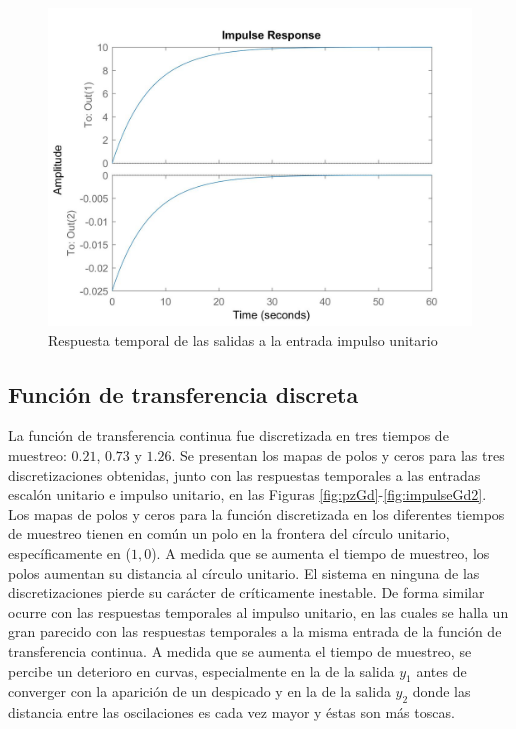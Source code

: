 \documentclass[journal]{IEEEtran}
\begin{document}
\begin{figure}[ht!]
\caption{Respuesta temporal de las salidas a la entrada impulso unitario\label{fig:impulseGr}}
  \centering
\includegraphics[scale=0.18]{tf/impulse_Gr.jpg}
\end{figure}

\subsection{Función de transferencia discreta}
La función de transferencia continua fue discretizada en tres tiempos de muestreo: $0.21$, $0.73$ y $1.26$. Se presentan los mapas de polos y ceros para las tres discretizaciones obtenidas, junto con las respuestas temporales a las entradas escalón unitario e impulso unitario, en las Figuras \ref{fig:pzGd}-\ref{fig:impulseGd2}. Los mapas de polos y ceros para la función discretizada en los diferentes tiempos de muestreo tienen en común un polo en la frontera del círculo unitario, específicamente en ($1,0$). A medida que se aumenta el tiempo de muestreo, los polos aumentan su distancia al círculo unitario. El sistema en ninguna de las discretizaciones pierde su carácter de críticamente inestable. De forma similar ocurre con las respuestas temporales al impulso unitario, en las cuales se halla un gran parecido con las respuestas temporales a la misma entrada de la función de transferencia continua. A medida que se aumenta el tiempo de muestreo, se percibe un deterioro en curvas, especialmente en la de la salida $y_1$ antes de converger con la aparición de un despicado y en la de la salida $y_2$ donde las distancia entre las oscilaciones es cada vez mayor y éstas son más toscas.\\ 
\end{document}
